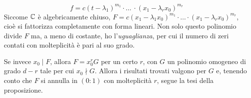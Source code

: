 \begin{demonstration}
\begin{enumerate}[label=\Roman*]
\begin{equation*}
				f=c(t-\lambda_1)^{m_1}\cdot \ldots\ \cdot (x_1-\lambda_r x_0)^{m_r}
			\end{equation*}
			Siccome $\mathbb{C}$ è algebricamente chiuso, $F=c(x_1-\lambda_1x_0)^{m_1}\cdot \ldots\cdot (x_1-\lambda_rx_0)^{m_r}$, cioè si fattorizza completamente con forma lineari. Non solo questo polinomio divide $F$ ma, a meno di costante, ho l'\textit{uguaglianza}, per cui il numero di zeri contati con molteplicità è pari al suo grado.
		\end{enumerate}
	Se invece $x_0\mid F$, allora $F=x_0^r G$ per un certo $r$, con $G$ un polinomio omogeneo di grado $d-r$ tale per cui $x_0\nmid G$. Allora i risultati trovati valgono per $G$ e, tenendo conto che $F$ si annulla in $(0\colon 1)$ con molteplicità $r$, segue la tesi della proposizione.
\end{demonstration}
